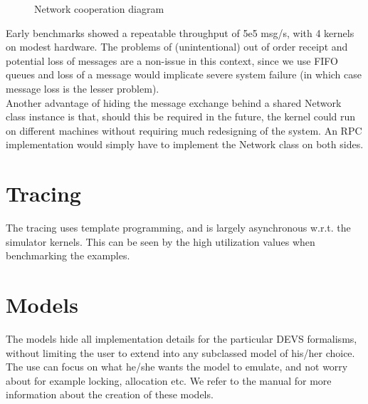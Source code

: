 \documentclass[8pt,a4paper]{report}
\begin{document}
\begin{figure}[h!]
	\caption{Network cooperation diagram}
	\label{networkdesign}
\end{figure} 
Early benchmarks showed a repeatable throughput of 5e5 msg/s, with 4 kernels on modest hardware. The problems of (unintentional) out of order receipt and potential loss of messages are a non-issue in this context, since we use FIFO queues and loss of a message would implicate severe system failure (in which case message loss is the lesser problem).\\
Another advantage of hiding the message exchange behind a shared Network class instance is that, should this be required in the future, the kernel could run on different machines without requiring much redesigning of the system. An RPC implementation would simply have to implement the Network class on both sides.

\section{Tracing}
The tracing uses template programming, and is largely asynchronous w.r.t. the simulator kernels. This can be seen by the high utilization values when benchmarking the examples.

\section{Models}
The models hide all implementation details for the particular DEVS formalisms, without limiting the user to extend into any subclassed model of his/her choice. The use can focus on what he/she wants the model to emulate, and not worry about for example locking, allocation etc. We refer to the manual for more information about the creation of these models.
\end{document}
